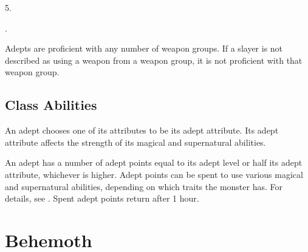          5.

         .

        Adepts are proficient with any number of weapon groups.
        If a slayer is not described as using a weapon from a weapon group, it is not proficient with that weapon group.

    \subsection{Class Abilities}

         An adept chooses one of its attributes to be its adept attribute.
        Its adept attribute affects the strength of its magical and supernatural abilities.

         An adept has a number of adept points equal to its adept level or half its adept attribute, whichever is higher.
        Adept points can be spent to use various magical and supernatural abilities, depending on which traits the monster has.
        For details, see .
        Spent adept points return after 1 hour.

\section{Behemoth}\label{Behemoth}

